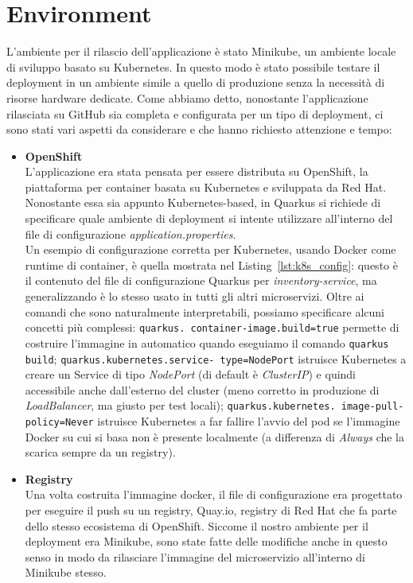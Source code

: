 \section{Environment}
L'ambiente per il rilascio dell'applicazione è stato Minikube, un ambiente locale di sviluppo basato su Kubernetes. In questo modo è stato possibile testare il deployment in un ambiente simile a quello di produzione senza la necessità di risorse hardware dedicate. Come abbiamo detto, nonostante l'applicazione rilasciata su GitHub sia completa e configurata per un tipo di deployment, ci sono stati vari aspetti da considerare e che hanno richiesto attenzione e tempo:
\begin{itemize}
    \item \textbf{OpenShift} \\
        L'applicazione era stata pensata per essere distributa su OpenShift, la piattaforma per container basata su Kubernetes e sviluppata da Red Hat. Nonostante essa sia appunto Kubernetes-based, in Quarkus si richiede di specificare quale ambiente di deployment si intente utilizzare all'interno del file di configurazione \textit{application.properties}. \\
        Un esempio di configurazione corretta per Kubernetes, usando Docker come runtime di container, è quella mostrata nel Listing~\ref{lst:k8s_config}: questo è il contenuto del file di configurazione Quarkus per \textit{inventory-service}, ma generalizzando è lo stesso usato in tutti gli altri microservizi. Oltre ai comandi che sono naturalmente interpretabili, possiamo specificare alcuni concetti più complessi: \texttt{quarkus. \allowbreak container-image.build=true} permette di costruire l'immagine in automatico quando eseguiamo il comando \texttt{quarkus build}; \texttt{quarkus.kubernetes.service- \allowbreak type=NodePort} istruisce Kubernetes a creare un Service di tipo \textit{NodePort} (di default è \textit{ClusterIP}) e quindi accessibile anche dall'esterno del cluster (meno corretto in produzione di \textit{LoadBalancer}, ma giusto per test locali); \texttt{quarkus.kubernetes. \allowbreak image-pull-policy=Never} istruisce Kubernetes a far fallire l'avvio del pod se l'immagine Docker su cui si basa non è presente localmente (a differenza di \textit{Always} che la scarica sempre da un registry).
    \item \textbf{Registry} \\
        Una volta costruita l'immagine docker, il file di configurazione era progettato per eseguire il push su un registry, Quay.io, registry di Red Hat che fa parte dello stesso ecosistema di OpenShift. Siccome il nostro ambiente per il deployment era Minikube, sono state fatte delle modifiche anche in questo senso in modo da rilasciare l'immagine del microservizio all'interno di Minikube stesso. \\

\end{itemize}
